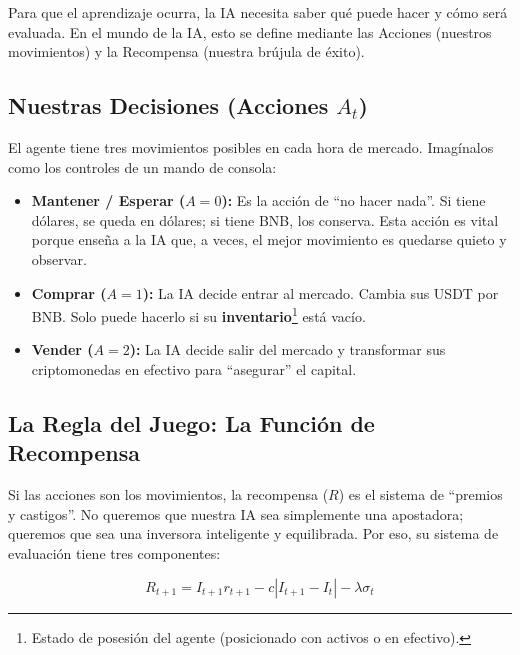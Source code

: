 \documentclass[12pt,a4paper]{article}
\begin{document}
Para que el aprendizaje ocurra, la IA necesita saber qué puede hacer y cómo será evaluada. En el mundo de la IA, esto se define mediante las Acciones (nuestros movimientos) y la Recompensa (nuestra brújula de éxito).

\subsection{Nuestras Decisiones (Acciones $A_t$)}

El agente tiene tres movimientos posibles en cada hora de mercado. Imagínalos como los controles de un mando de consola:

\begin{itemize}
    \item \textbf{Mantener / Esperar ($A=0$):} Es la acción de ``no hacer nada''. Si tiene dólares, se queda en dólares; si tiene BNB, los conserva. Esta acción es vital porque enseña a la IA que, a veces, el mejor movimiento es quedarse quieto y observar.
    \item \textbf{Comprar ($A=1$):} La IA decide entrar al mercado. Cambia sus USDT por BNB. Solo puede hacerlo si su \textbf{inventario}\footnote{Estado de posesión del agente (posicionado con activos o en efectivo).} está vacío.
    \item \textbf{Vender ($A=2$):} La IA decide salir del mercado y transformar sus criptomonedas en efectivo para ``asegurar'' el capital.
\end{itemize}

\subsection{La Regla del Juego: La Función de Recompensa}

Si las acciones son los movimientos, la recompensa ($R$) es el sistema de ``premios y castigos''. No queremos que nuestra IA sea simplemente una apostadora; queremos que sea una inversora inteligente y equilibrada. Por eso, su sistema de evaluación tiene tres componentes:

\begin{equation}
    R_{t+1} = I_{t+1}r_{t+1} - c|I_{t+1} - I_t| - \lambda \sigma_t
\end{equation}
\end{document}
